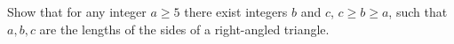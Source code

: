 Show that for any integer $a\ge 5$ there exist integers $b$ and $c$,  $c\ge b\ge a$,  such that $a,b,c$ are the lengths of the sides of a right-angled triangle.